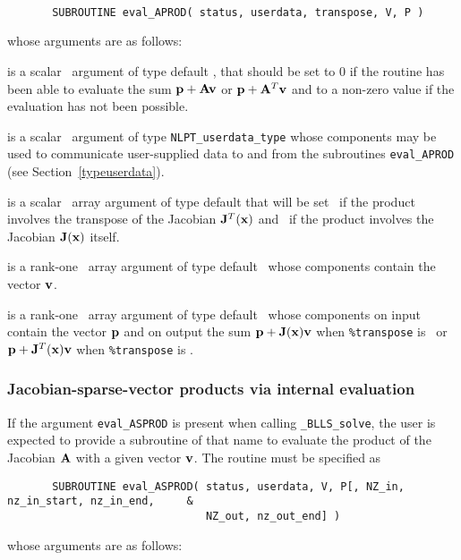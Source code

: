 \documentclass{galahad}
\newcommand{\packagename}{BLLS}
\newcommand{\fullpackagename}{\libraryname\_\packagename}
\newcommand{\solver}{{\tt \fullpackagename\_solve}}
\begin{document}
\def\baselinestretch{0.8}
{\tt
\begin{verbatim}
       SUBROUTINE eval_APROD( status, userdata, transpose, V, P )
\end{verbatim} }
\def\baselinestretch{1.0}
\noindent whose arguments are as follows:

\begin{description}
 is a scalar \intentout\ argument of type default \integer,
that should be set to 0 if the routine has been able to evaluate the
sum ${\mathbf{p}} + {\mathbf{A}} {\mathbf{v}}$ or ${\mathbf{p}} + {\mathbf{A}}^T{\mathbf{v}}$
and to a non-zero value if the evaluation has not been possible.

 is a scalar \intentinout\ argument of type
{\tt NLPT\_userdata\_type} whose components may be used
to communicate user-supplied data to and from the subroutines
{\tt eval\_APROD}
(see Section~\ref{typeuserdata}).

 is a scalar \intentin\ array argument of type
default that will be set \true\ if the product involves the transpose
of the Jacobian ${\mathbf{J}}^T({\mathbf{x}})$ and \false\ if the product involves
the Jacobian ${\mathbf{J}}({\mathbf{x}})$ itself.

 is a rank-one \intentin\ array argument of type default \realdp\
whose components contain the vector ${\mathbf{v}}$.

 is a rank-one \intentinout\ array argument of type default \realdp\
whose components on input contain the vector ${\mathbf{p}}$ and on output the
sum ${\mathbf{p}} + {\mathbf{J}}({\mathbf{x}}) {\mathbf{v}}$ when {\tt \%transpose} is \false\ or
${\mathbf{p}} + {\mathbf{J}}^T({\mathbf{x}}) {\mathbf{v}}$ when {\tt \%transpose} is \true.

\end{description}



\subsubsection{Jacobian-sparse-vector products via internal evaluation\label{jvps}}

If the argument {\tt eval\_ASPROD} is present when calling \solver, the
user is expected to provide a subroutine of that name to evaluate the
product of the Jacobian ${\mathbf{A}}$ with a given vector ${\mathbf{v}}$.
The routine must be specified as

\def\baselinestretch{0.8}
{\tt \begin{verbatim}
       SUBROUTINE eval_ASPROD( status, userdata, V, P[, NZ_in, nz_in_start, nz_in_end,     &
                               NZ_out, nz_out_end] )
\end{verbatim} }
\def\baselinestretch{1.0}
\noindent whose arguments are as follows:
\end{document}
